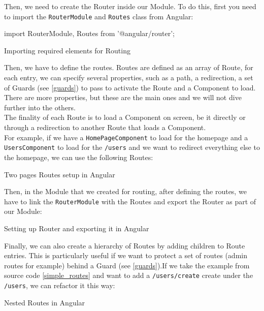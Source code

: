 \documentclass[11pt,a4paper]{report}
\newenvironment{code}{\captionsetup{type=listing}}{}
\begin{document}
Then, we need to create the Router inside our Module. To do this, first you need to import the \verb+RouterModule+ and \verb+Routes+ class from Angular:
\begin{code}
	\begin{inlinets}
import { RouterModule, Routes } from '@angular/router';
	\end{inlinets}
	\caption{Importing required elements for Routing}
\end{code}

Then, we have to define the routes. Routes are defined as an array of Route, for each entry, we can specify several properties, such as a path, a redirection, a set of Guards (see \ref{guards}) to pass to activate the Route and a Component to load. There are more properties, but these are the main ones and we will not dive further into the others. \\

The finality of each Route is to load a Component on screen, be it directly or through a redirection to another Route that loads a Component. \\

For example, if we have a \verb+HomePageComponent+ to load for the homepage and a \verb+UsersComponent+ to load for the \verb+/users+ and we want to redirect everything else to the homepage, we can use the following Routes:
\begin{code}
	\caption{Two pages Routes setup in Angular}
	\label{simple_routes}
\end{code}

Then, in the Module that we created for routing, after defining the routes, we have to link the \verb+RouterModule+ with the Routes and export the Router as part of our Module:
\begin{code}
	\caption{Setting up Router and exporting it in Angular}
\end{code}

Finally, we can also create a hierarchy of Routes by adding children to Route entries. This is particularly useful if we want to protect a set of routes (admin routes for example) behind a Guard (see \ref{guards}).If we take the example from source code \ref{simple_routes} and want to add a \verb+/users/create+ create under the \verb+/users+, we can refactor it this way:
\begin{code}
	\caption{Nested Routes in Angular}
	\label{nested_routes}
\end{code}
\end{document}
